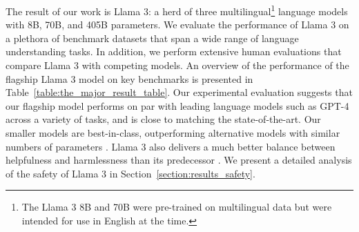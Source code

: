 The result of our work is Llama 3: a herd of three multilingual\footnote{The Llama 3 8B and 70B were pre-trained on multilingual data but were intended for use in English at the time.} language models with 8B, 70B, and 405B parameters.
We evaluate the performance of Llama 3 on a plethora of benchmark datasets that span a wide range of language understanding tasks. 
In addition, we perform extensive human evaluations that compare Llama 3 with competing models. 
An overview of the performance of the flagship Llama 3 model on key benchmarks is presented in Table~\ref{table:the_major_result_table}.
Our experimental evaluation suggests that our flagship model performs on par with leading language models such as GPT-4 \citep{openai2023gpt4} across a variety of tasks, and is close to matching the state-of-the-art. 
Our smaller models are best-in-class, outperforming alternative models with similar numbers of parameters \citep{bai2023qwen,jiang2023mistral}. 
Llama 3 also delivers a much better balance between helpfulness and harmlessness than its predecessor \citep{touvron2023llama2}.
We present a detailed analysis of the safety of Llama 3 in Section~\ref{section:results_safety}.


